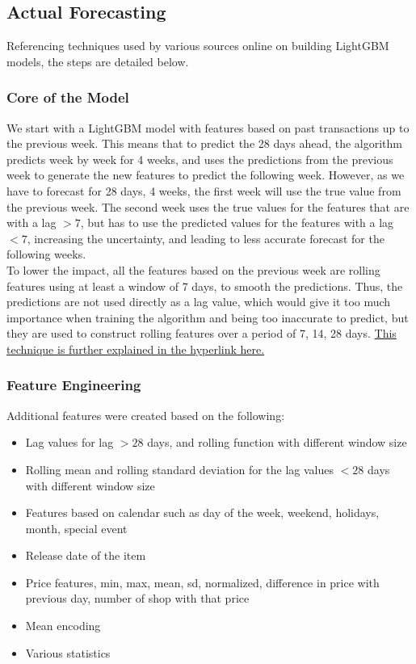 \documentclass[12pt]{article}
\begin{document}
\subsection*{Actual Forecasting}

Referencing techniques used by various sources online on building LightGBM models, the steps are detailed below. 

\subsubsection*{Core of the Model}

We start with a LightGBM model with features based on past transactions up to the previous week. This means that to predict the 28 days ahead, the algorithm predicts week by week for 4 weeks, and uses the predictions from the previous week to generate the new features to predict the following week. However, as we have to forecast for 28 days, 4 weeks, the first week will use the true value from the previous week. The second week uses the true values for the features that are with a lag $> 7$, but has to use the predicted values for the features with a lag $< 7$, increasing the uncertainty, and leading to less accurate forecast for the following weeks. \\ 

\noindent To lower the impact, all the features based on the previous week are rolling features using at least a window of 7 days, to smooth the predictions. Thus, the predictions are not used directly as a lag value, which would give it too much importance when training the algorithm and being too inaccurate to predict, but they are used to construct rolling features over a period of 7, 14, 28 days. \href{https://www.christophenicault.com/post/m5_forecasting_accuracy}{This technique is further explained in the hyperlink here.}

\subsubsection*{Feature Engineering}

Additional features were created based on the following: \begin{itemize}
    \item Lag values for lag $> 28$ days, and rolling function with different window size
    \item Rolling mean and rolling standard deviation for the lag values $< 28$ days with different window size
    \item Features based on calendar such as day of the week, weekend, holidays, month, special event 
    \item Release date of the item
    \item Price features, min, max, mean, sd, normalized, difference in price with previous day, number of shop with that price
    \item Mean encoding
    \item Various statistics
\end{itemize}
\end{document}
